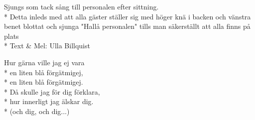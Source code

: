 \begin{SongText}
    \begin{SongInfo}
        Sjungs som tack sång till personalen efter sittning.\\*%
        Detta inleds med att alla gäster ställer sig med höger knä i backen och vänstra benet blottat och sjunga "Hallå personalen" tills man säkerställt att alla finns på plats\\*%
        Text \& Mel: Ulla Billquist
    \end{SongInfo}
    \begin{SongVerse}
        Hur gärna ville jag ej vara\\*%
        en liten blå förgätmigej,\\*%
        en liten blå förgätmigej.\\*%
        Då skulle jag för dig förklara,\\*%
        hur innerligt jag älskar dig.\\*%
        (och dig, och dig...)
    \end{SongVerse}
\end{SongText}
